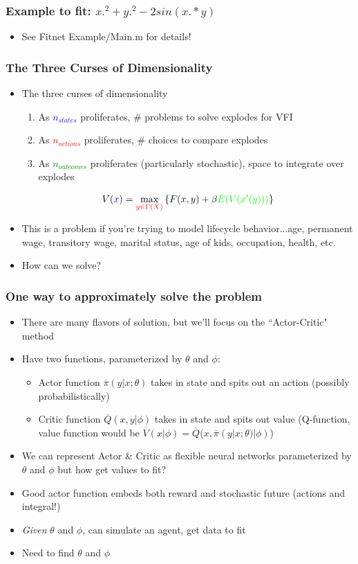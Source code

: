 \documentclass{beamer}
\begin{document}
\begin{frame}
\frametitle[alignment=center]{Example to fit:  $x.^2+y.^2-2sin(x.*y)$}
\begin{itemize}
\item See Fitnet Example/Main.m for details!
\end{itemize}
\end{frame}


\begin{frame}
\frametitle[alignment=center]{The Three Curses of Dimensionality}
\begin{itemize}
\item The three curses of dimensionality
\bigskip
\begin{enumerate}
\item As \textcolor{blue}{$n_{states}$} proliferates, \# problems to solve explodes for VFI
\smallskip
\item As \textcolor{red}{$n_{actions}$} proliferates, \# choices to compare explodes
\smallskip
\item As \textcolor{green}{$n_{outcomes}$} proliferates (particularly stochastic), space to integrate over explodes
\end{enumerate}
$$V(\textcolor{blue}{x})=\max_{\textcolor{red}{y\in\Gamma(X)}}\left\{F(x,y)+\beta \textcolor{green}{E(V(x'(y)))}\right\}$$
\item This is a problem if you're trying to model lifecycle behavior...age, permanent wage, transitory wage, marital status, age of kids, occupation, health, etc.
\bigskip
\item How can we solve?
\end{itemize}
\end{frame}


\begin{frame}
\frametitle[alignment=center]{One way to approximately solve the problem}
\begin{itemize}
\item There are many flavors of solution, but we'll focus on the ``Actor-Critic" method
\bigskip
\item Have two functions, parameterized by $\theta$ and $\phi$:
\begin{itemize}
\item Actor function $\overline{\pi}(y|x;\theta)$ takes in state and spits out an action (possibly probabilistically)
\bigskip
\item Critic function $\overline{Q}(x,y|\phi)$  takes in state and spits out value (Q-function, value function would be $\overline{V}(x|\phi)=\overline{Q}(x,\overline{\pi}(y|x;\theta)|\phi)$)
\end{itemize}
\bigskip
\item We can represent Actor \& Critic as flexible neural networks parameterized by $\theta$ and $\phi$ but how get values to fit?
\bigskip
\item Good actor function embeds both reward and stochastic future (actions and integral!)
\bigskip
\item \emph{Given} $\theta$ and $\phi$, can simulate an agent, get data to fit
\bigskip
\item Need to find $\theta$ and $\phi$
\end{itemize}
\end{frame}
\end{document}
